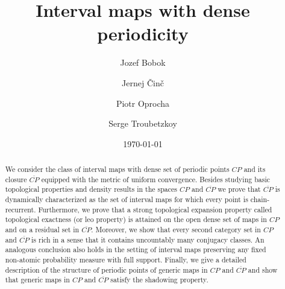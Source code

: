 \documentclass[12pt, a4paper]{amsart}
\newcommand{\?}{{\bf ???}}
\def\CP{\overline{CP}}
\begin{document}
\title[Interval maps with dense periodicity]
{Interval maps with dense periodicity}
\author{Jozef Bobok}
\author{Jernej \v Cin\v c}
\author{Piotr Oprocha}
\author{Serge Troubetzkoy}

\date{\today}
	
	
	\begin{abstract}
We consider the class of interval maps with dense set of periodic points $CP$ and its closure $\overline{CP}$ equipped with the metric of uniform convergence. Besides studying basic topological properties and density results in the spaces $CP$ and $\overline{CP}$ we prove that $\overline{CP}$ is dynamically characterized as the set of interval maps for which every point is chain-recurrent. Furthermore, we prove that a strong topological expansion property called topological exactness (or leo property) is attained on the open dense set of maps in $CP$ and on a residual set in $\CP$. Moreover, we show that every second category set in $CP$ and $\CP$ is rich in a sense that it contains uncountably many conjugacy classes. 
 An analogous conclusion also holds in the setting of interval maps preserving any fixed non-atomic probability measure with full support.
Finally, we give a detailed description of the structure of periodic points of generic maps in $CP$ and $\CP$ and show that generic maps in  $CP$ and $\CP$ satisfy the shadowing property.
	\end{abstract}

\address[J.\ Bobok]{Department of Mathematics of FCE, Czech Technical University in Prague,
Th\'akurova 7, 166 29 Prague 6, Czech Republic}

\address[J.\ \v{C}in\v{c}]{University of Maribor, Koro\v ska 160, 2000 Maribor, Slovenia
	-- and --
	Abdus Salam International Centre for Theoretical Physics (ICTP), Trieste, Italy}

\address[P.\ Oprocha]{AGH University of Krakow, Faculty of Applied Mathematics,
al.\ Mickiewicza 30, 30-059 Krak\'ow, Poland. -- and --
Centre of Excellence IT4Innovations - Institute for Research and Applications of Fuzzy Modeling, University of Ostrava, 30. dubna 22, 701 03 Ostrava 1, Czech Republic}

\address[S.\ Troubetzkoy]{Aix Marseille Univ, CNRS, I2M, Marseille, France}



\end{document}
